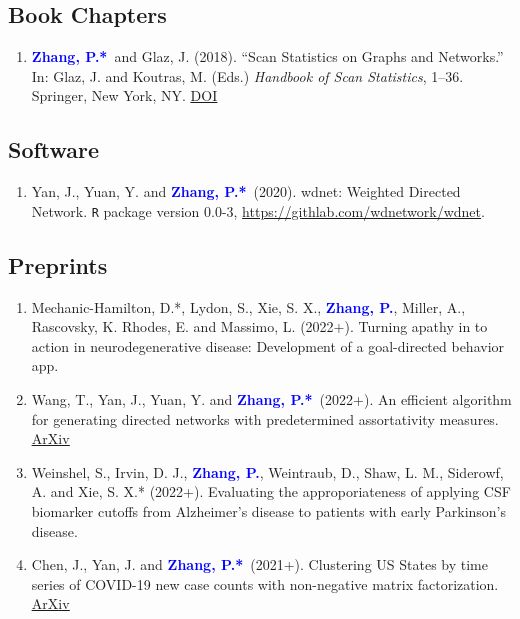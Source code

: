 \documentclass{res}
\newcommand{\PZ}{\textbf{\textcolor{blue}{Zhang, P.*}}}
\newcommand{\PZnot}{\textbf{\textcolor{blue}{Zhang, P.}}}
\begin{document}
\begin{resume}
\subsection{Book Chapters}
\begin{enumerate}
	\item \PZ\ and {\sc Glaz, J.} (2018). ``Scan 
	Statistics on Graphs and Networks.'' In: Glaz, J. and Koutras, 
	M. (Eds.) {\em Handbook of Scan Statistics}, 1--36. Springer, 
	New York, NY. 
	\href{https://doi.org/10.1007/978-1-4614-8414-1_43-1}
	{\underline{DOI}}	
\end{enumerate}

\subsection{Software}
\begin{enumerate}
	\item {\sc Yan, J., Yuan, Y.} and \PZ\ (2020). 
	wdnet: Weighted Directed Network. {\tt R} package version 0.0-3, 
	\url{https://githlab.com/wdnetwork/wdnet}.
\end{enumerate}

\subsection{Preprints}
\begin{enumerate}
	\item {\sc Mechanic-Hamilton, D.*, Lydon, S., Xie, S. X.,} 
	\PZnot, {\sc Miller, A., Rascovsky, K. Rhodes, E.} and {\sc 
	Massimo, L.} (2022+). Turning apathy in to action in 
	neurodegenerative disease: Development of a goal-directed 
	behavior app.
	
	\item {\sc Wang, T., Yan, J., Yuan, Y.} and \PZ\ (2022+). An 
	efficient algorithm for generating directed networks with 
	predetermined assortativity measures. 
	\href{https://arxiv.org/pdf/2201.03451.pdf}{\underline{ArXiv}}
	
	\item {\sc Weinshel, S., Irvin, D. J.,} \PZnot, {\sc Weintraub, 
	D., Shaw, L. M., Siderowf, A. and Xie, S. X.*} (2022+). 
	Evaluating the approporiateness of applying CSF biomarker 
	cutoffs from Alzheimer's disease to patients with early 
	Parkinson's disease.
	
	\item {\sc Chen, J., Yan, J.} and \PZ\ (2021+). 
	Clustering US States by time series of COVID-19 new case counts 
	with non-negative matrix factorization. 
	\href{https://arxiv.org/pdf/2011.14412.pdf}{\underline{ArXiv}}
	

\end{enumerate}
\end{resume}
\end{document}
